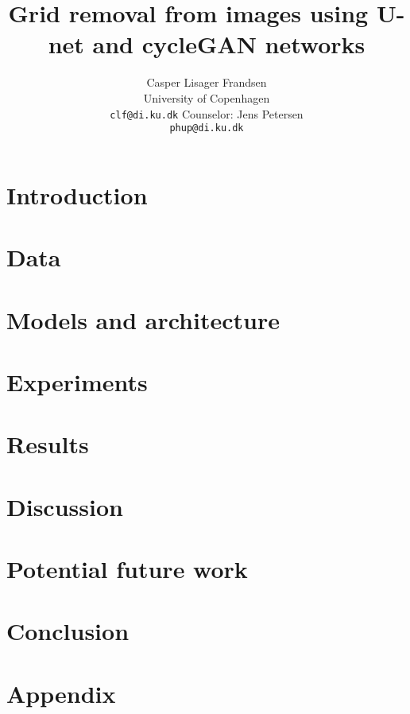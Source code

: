 \documentclass{article}
\title{Grid removal from images using U-net and cycleGAN networks}
\author{Casper Lisager Frandsen\\
  University of Copenhagen\\
  \texttt{clf@di.ku.dk}
  \AND
  Counselor: Jens Petersen\\
  \texttt{phup@di.ku.dk}
}
\begin{document}
\maketitle
\tableofcontents
\newpage



\section{Introduction}


\section{Data}


\section{Models and architecture}


\section{Experiments}


\section{Results} %

\section{Discussion} %


\section{Potential future work}


\section{Conclusion}


\section{Appendix}




\end{document}
